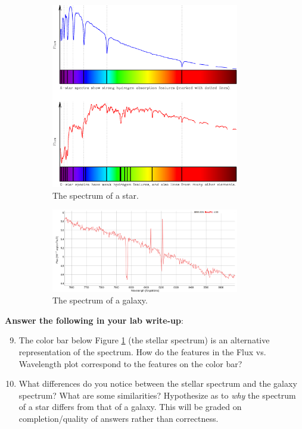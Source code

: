 \documentclass[11pt]{article}
\begin{document}
\begin{figure}[h!]
    \centering
    \begin{subfigure}[b]{0.75\textwidth}
        \centering
        \includegraphics[width=0.9\textwidth,trim={0cm 9.75cm 0cm 0cm},clip]{Images/spectrum.png}
        \caption{The spectrum of a star.}
        \label{fig:stellar_spec}
    \end{subfigure}
    \hfill
    \begin{subfigure}[b]{0.75\textwidth}
        \centering
        \includegraphics[width=0.9\textwidth,trim={0cm 0cm 0cm 1cm},clip]{Images/gal_spec.png}
        \caption{The spectrum of a galaxy.}
        \label{fig:gal_spec}
    \end{subfigure}
    \caption{}
    \label{fig:spec}
\end{figure}

\medskip
\textbf{Answer the following in your lab write-up}:
\begin{enumerate}
    \setcounter{enumi}{8}
    \item The color bar below Figure \ref{fig:stellar_spec} (the stellar spectrum) is an alternative representation of the spectrum. How do the features in the Flux vs. Wavelength plot correspond to the features on the color bar?
    \item What differences do you notice between the stellar spectrum and the galaxy spectrum? What are some similarities? Hypothesize as to \emph{why} the spectrum of a star differs from that of a galaxy. This will be graded on completion/quality of answers rather than correctness.
\end{enumerate}
\end{document}
